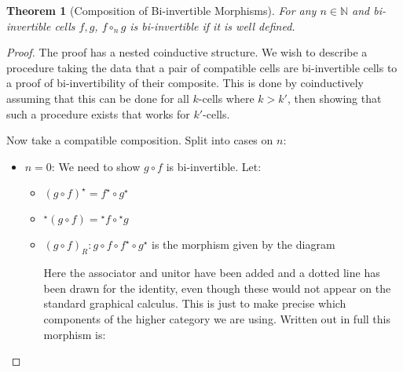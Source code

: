 \documentclass{article}
\newtheorem{theorem}{Theorem}
\theoremstyle{definition}
\theoremstyle{examplestyle}
\newcommand{\linv}[1]{{}^\star\!#1}
\newcommand{\rinv}[1]{#1^\star}
\begin{document}
\begin{theorem}[Composition of Bi-invertible Morphisms]
  For any \(n \in \mathbb{N}\) and bi-invertible cells \(f,g\), \(f \circ_n g\) is bi-invertible if it is well defined.
\end{theorem}
\begin{proof}
  The proof has a nested coinductive structure. We wish to describe a procedure taking the data that a pair of compatible cells are bi-invertible cells to a proof of bi-invertibility of their composite. This is done by coinductively assuming that this can be done for all \(k\)-cells where \(k>k'\), then showing that such a procedure exists that works for \(k'\)-cells.

  Now take a compatible composition. Split into cases on \(n\):
  \begin{itemize}
  \item \(n = 0\): We need to show \(g \circ f\) is bi-invertible. Let:
    \begin{itemize}
      \item \(\rinv {(g \circ f)} = \rinv f \circ \rinv g\)
      \item \(\linv {(g \circ f)} = \linv f \circ \linv g\)
      \item \({(g \circ f)}_R : g \circ f \circ \rinv f \circ \rinv g\) is the morphism given by the diagram
        \begin{center}
        \end{center}
        Here the associator and unitor have been added and a dotted line has been drawn for the identity, even though these would not appear on the standard graphical calculus. This is just to make precise which components of the higher category we are using. Written out in full this morphism is:

\end{itemize}
\end{itemize}
\end{proof}
\end{document}
